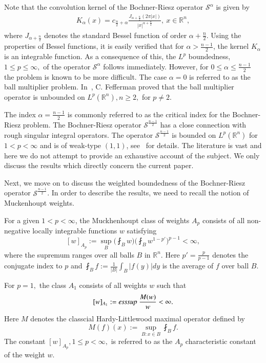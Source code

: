 \documentclass[a4paper,12pt]{amsart}
\newcommand{\R}{{\mathbb {R}}}
\begin{document}
Note that the convolution kernel of the Bochner-Riesz operator $\mathcal {S}^{\alpha}$ is given by 
\begin{eqnarray*}
K_{\alpha}(x)=c_{\frac{n}{2}+\alpha} \frac{ J_{\alpha+\frac{n}{2}} (2\pi |x|)} {|x|^{\alpha+\frac{n}{2}}},~x\in \R^n,
\end{eqnarray*}
where $J_{\alpha+\frac{n}{2}}$ denotes the standard Bessel function of order $\alpha+\frac{n}{2}$. Using the properties of Bessel functions, it is easily verified that for $\alpha>\frac{n-1}{2}$, the kernel $K_{\alpha}$ is an integrable function. As a consequence of this, the $L^p$ boundedness, $1\leq p\leq \infty,$ of the operator $\mathcal {S}^{\alpha}$ follows immediately. However, for $0\leq \alpha\leq \frac{n-1}{2}$ the problem is known to be more difficult. The case $\alpha=0$ is referred to as the ball multiplier problem. In~\cite{F2}, C. Fefferman proved that the ball multiplier operator is unbounded on $L^p(\R^n), n\geq 2,$ for $p\neq 2.$ 

The index $\alpha= \frac{n-1}{2}$ is commonly referred to as the critical index for the Bochner-Riesz problem. The Bochner-Riesz operator $\mathcal {S}^{\frac{n-1}{2}}$ has a close connection with rough singular integral operators. The operator $\mathcal {S}^{\frac{n-1}{2}}$ is bounded on $L^p(\R^n)$ for $1<p<\infty$ and is of weak-type $(1,1)$, see~\cite{MC,Di,Seeger,St1,AV} for details. The literature is vast and here we do not attempt to provide an exhaustive account of the subject.  We only discuss the results which directly concern the current paper. 

Next, we move on to discuss the weighted boundedness of the Bochner-Riesz operator $\mathcal {S}^{\frac{n-1}{2}}$. In order to describe the results, we need to recall the notion of Muckenhoupt weights. 

For a given $1<p<\infty$, the Muckhenhoupt class of weights $A_p$ consists of all non-negative locally integrable functions $w$ satisfying
$$
[w]_{A_p}:=\sup_B \bigg(\fint_B w \bigg)\bigg(\fint_B w^{1-p'} \bigg)^{p-1} <\infty,
$$
where the supremum ranges over all balls $B$ in $\R^n$. Here $p'=\frac{p}{p-1}$ denotes the conjugate index to $p$ and $\fint_B f:=\frac{1}{|B|}\int_B |f(y)|dy$ is the average of $f$ over ball $B.$ 

For $p=1,$ the class $A_1$ consists of all weights $w$ such that 
$$
[w]_{A_1}:={\it{ess}sup}~ \frac{M (w)}{w}<\infty.
$$
Here $M$ denotes the classcial Hardy-Littlewood maximal operator defined by 
$$
M(f)(x):=\sup_{B:x\in B} \fint_B f.
$$
The constant $[w]_{A_p}, 1\leq p<\infty,$ is referred to as the $A_p$ characteristic constant of the weight $w$.
 
\end{document}
